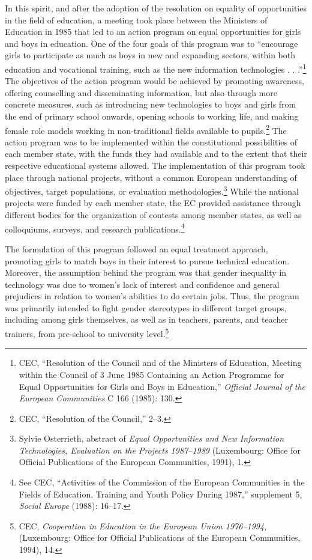 \documentclass{tufte-handout}
\begin{document}
In this spirit, and after the adoption of the resolution on equality of
opportunities in the field of education, a meeting took place between
the Ministers of Education in 1985 that led to an action program on
equal opportunities for girls and boys in education. One of the four
goals of this program was to ``encourage girls to participate as much as
boys in new and expanding sectors, within both education and vocational
training, such as the new information technologies . . .''\footnote{CEC,
  ``Resolution of the Council and of the Ministers of Education, Meeting
  within the Council of 3 June 1985 Containing an Action Programme for
  Equal Opportunities for Girls and Boys in Education,'' \emph{Official
  Journal of the European Communities} C 166 (1985): 130.} The
objectives of the action program would be achieved by promoting
awareness, offering counselling and disseminating information, but also
through more concrete measures, such as introducing new technologies to
boys and girls from the end of primary school onwards, opening schools
to working life, and making female role models working in
non-traditional fields available to pupils.\footnote{CEC, ``Resolution
  of the Council,'' 2­--3.} The action program was to be implemented
within the constitutional possibilities of each member state, with the
funds they had available and to the extent that their respective
educational systems allowed. The implementation of this program took
place through national projects, without a common European understanding
of objectives, target populations, or evaluation
methodologies.\footnote{Sylvie Osterrieth, abstract of \emph{Equal
  Opportunities and New Information Technologies, Evaluation on the
  Projects 1987--1989} (Luxembourg: Office for Official Publications of
  the European Communities, 1991), 1.} While the national projects were
funded by each member state, the EC provided assistance through
different bodies for the organization of contests among member states,
as well as colloquiums, surveys, and research publications.\footnote{See
  CEC, ``Activities of the Commission of the European Communities in the
  Fields of Education, Training and Youth Policy During 1987,''
  supplement 5, \emph{Social Europe} (1988): 16--17.}

The formulation of this program followed an equal treatment approach,
promoting girls to match boys in their interest to pursue technical
education. Moreover, the assumption behind the program was that gender
inequality in technology was due to women's lack of interest and
confidence and general prejudices in relation to women's abilities to do
certain jobs. Thus, the program was primarily intended to fight gender
stereotypes in different target groups, including among girls
themselves, as well as in teachers, parents, and teacher trainers, from
pre-school to university level.\footnote{CEC, \emph{Cooperation in
  Education in the European Union 1976--1994}, (Luxembourg: Office for
  Official Publications of the European Communities, 1994), 14.}
\end{document}
